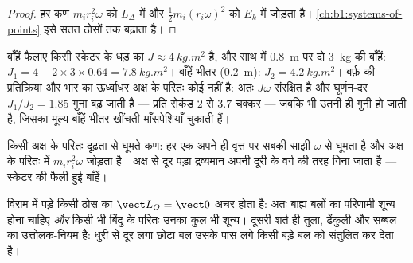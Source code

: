 \begin{proof}
हर कण $m_ir_i^2\omega$ को $L_\Delta$ में और
$\tfrac12 m_i(r_i\omega)^2$ को $E_k$ में जोड़ता है। \cref{ch:b1:systems-of-points}
इसे सतत ठोसों तक बढ़ाता है।
\end{proof}

\begin{example}[स्केटर]\label{ex:b1:angular-momentum:skater}
बाँहें फैलाए किसी स्केटर के धड़ का $J \approx \qty{4}{kg.m^2}$ है, और साथ में
\qty{0.8}{m} पर दो \qty{3}{kg} की बाँहें: $J_1 = 4 + 2 \times 3 \times 0.64 =
\qty{7.8}{kg.m^2}$। बाँहें भीतर (\qty{0.2}{m}): $J_2 = \qty{4.2}{kg.m^2}$।
बर्फ़ की प्रतिक्रिया और भार का ऊर्ध्वाधर अक्ष के परितः कोई  नहीं है:
अतः $J\omega$ संरक्षित है और घूर्णन-दर $J_1/J_2 = 1.85$ गुना बढ़ जाती है
--- प्रति सेकंड $2$ से $3.7$ चक्कर --- जबकि  भी उतनी ही गुनी हो
जाती है, जिसका मूल्य बाँहें भीतर खींचती माँसपेशियाँ चुकाती हैं।
\end{example}

\begin{omfigure}

{\small किसी अक्ष के परितः दृढ़ता से घूमते कण: हर एक अपने ही वृत्त पर सबकी
साझी $\omega$ से घूमता है और अक्ष के परितः  में $m_ir_i^2\omega$
जोड़ता है। अक्ष से दूर पड़ा द्रव्यमान अपनी दूरी के वर्ग की तरह गिना जाता है
--- स्केटर की फैली हुई बाँहें।}
\end{omfigure}

\begin{remark}[स्थैतिकी]\label{rem:b1:angular-momentum:statics}
विराम में पड़े किसी ठोस का $\vect L_O = \vect 0$ अचर होता है: अतः बाह्य
बलों का परिणामी शून्य होना चाहिए \emph{और} किसी भी बिंदु के परितः उनका कुल
 भी शून्य। दूसरी शर्त ही तुला, ढेंकुली और सब्बल का उत्तोलक-नियम है:
धुरी से दूर लगा छोटा बल उसके पास लगे किसी बड़े बल को संतुलित कर देता है।
\end{remark}

